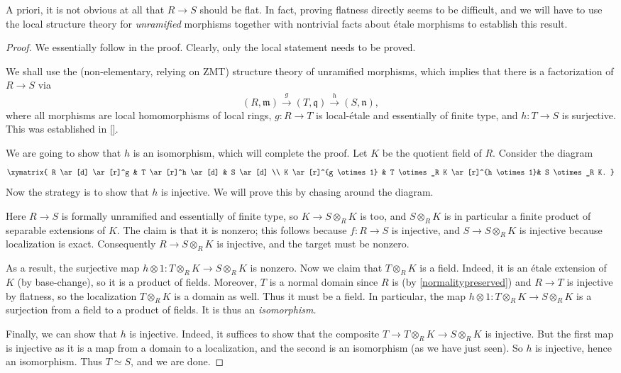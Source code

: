 A priori, it is not obvious at all that $R \to S$ should be flat. In fact,
proving flatness directly seems to be difficult, and we will have to use the
local structure theory for \emph{unramified} morphisms together with nontrivial
facts about \'etale morphisms to establish this result.
\begin{proof} 
We essentially follow \cite{Mi67} in the proof.
Clearly, only the local statement needs to be proved.

We shall use the (non-elementary, relying on ZMT) structure theory of unramified morphisms, 
which implies that there is a factorization of $R \to S$ via
\[ (R, \mathfrak{m}) \stackrel{g}{\to} (T, \mathfrak{q}) \stackrel{h}{\to} (S, \mathfrak{n}),  \]
where all morphisms are local homomorphisms of local rings, $g: R \to T$ is
local-\'etale and essentially of finite type, and $h:T \to S$ is surjective.
This was established in \cref{}.

We are going to show that $h$ is an isomorphism, which will complete the proof.
Let $K$ be the quotient field of $R$.
Consider the diagram
\[ \xymatrix{
R \ar[d] \ar[r]^g &  T \ar[r]^h \ar[d]  &  S \ar[d] \\
K \ar[r]^{g \otimes 1} & T \otimes_R K \ar[r]^{h \otimes 1}&   S
\otimes_R K.
}\]
Now the strategy is to show that $h$ is injective.
We will prove this by chasing around the diagram.

Here $R \to S$ is formally unramified and essentially of finite type, so $K \to S
\otimes_R K$ is too, and $S \otimes_R K$ is in particular a finite product of
separable extensions of $K$. The claim is that it is nonzero; this follows
because $f: R \to S$ is injective, and $S \to S \otimes_R K$ is injective
because localization is exact. Consequently $R \to S \otimes_R K$ is injective,
and the target must be nonzero.

As a result, the surjective map $h \otimes 1: T \otimes_R K \to S \otimes_R K$
is nonzero. Now we claim that  $T \otimes_R K$ is a field. Indeed, it is an \'etale extension
of $K$ (by base-change), so it is a product of fields.  Moreover, $T$ is a
normal domain since $R$ is (by \cref{normalitypreserved}) and $R \to T$ is injective by flatness,
so the localization $T \otimes_R K$ is a domain as well.
Thus it must be a field. In particular, the map $h \otimes 1: T \otimes_R K \to
S \otimes_R K$ is a surjection from a field to a product of fields. It is thus
an \emph{isomorphism.}

Finally, we can show that $h$ is injective. Indeed, it suffices to show that
the composite $T \to T \otimes_R K \to S \otimes_R K$ is injective. But the
first map is injective as it is a map from a domain to a localization, and the
second is an isomorphism (as we have just seen). So $h$ is injective, hence an
isomorphism. Thus $T \simeq S$, and we are done.
\end{proof} 

